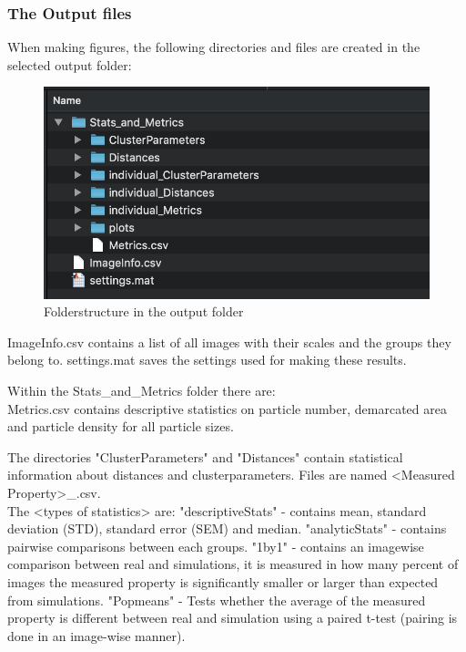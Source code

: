 \documentclass[12pt, a4paper]{scrartcl}
\begin{document}
\subsubsection{The Output files}
When making figures, the following directories and files are created in the selected output folder:
\begin{figure}[H]
\includegraphics[scale=0.7]{screenshots/scr_output.png}
\captionsetup{singlelinecheck=off}
\caption[thing]{Folderstructure in the output folder}
\end{figure}
ImageInfo.csv contains a list of all images with their scales and the groups they belong to. settings.mat saves the settings used for making these results.

Within the Stats\_and\_Metrics folder there are:\\
Metrics.csv contains descriptive statistics on particle number, demarcated area and particle density for all particle sizes.

The directories "ClusterParameters" and "Distances" contain statistical information about distances and clusterparameters. Files are named <Measured Property>\_<type of statistics>.csv.\\
The <types of statistics> are: "descriptiveStats" - contains mean, standard deviation (STD), standard error (SEM) and median. "analyticStats" - contains pairwise comparisons between each groups. "1by1" - contains an imagewise comparison between real and simulations, it is measured in how many percent of images the measured property is significantly smaller or larger than expected from simulations. "Popmeans" - Tests whether the average of the measured property is different between real and simulation using a paired t-test (pairing is done in an image-wise manner).
\end{document}
